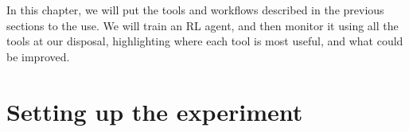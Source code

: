 \label{ch:AnalysingGraphs}

\begin{jointwork}
	In this chapter, we will put the tools and workflows described in the previous sections to the use. We will train an RL agent, and then monitor it using all the tools at our disposal, highlighting where each tool is most useful, and what could be improved.
\end{jointwork}

\section{Setting up the experiment}




